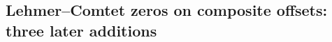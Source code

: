 \documentclass[11pt,a4paper]{article}
\numberwithin{equation}{section}
\theoremstyle{definition}
\theoremstyle{remark}
\theoremstyle{plain}
\begin{document}

\subsection{Lehmer--Comtet zeros on composite offsets: three later additions}\label{xx:lc:sec:intro}
\end{document}
